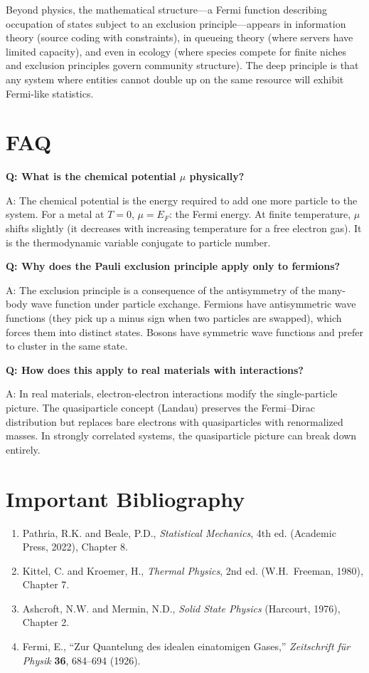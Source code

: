 Beyond physics, the mathematical structure---a Fermi function describing occupation of states subject to an exclusion principle---appears in information theory (source coding with constraints), in queueing theory (where servers have limited capacity), and even in ecology (where species compete for finite niches and exclusion principles govern community structure). The deep principle is that any system where entities cannot double up on the same resource will exhibit Fermi-like statistics.

\section*{FAQ}

\textbf{Q: What is the chemical potential $\mu$ physically?}

A: The chemical potential is the energy required to add one more particle to the system. For a metal at $T = 0$, $\mu = E_F$: the Fermi energy. At finite temperature, $\mu$ shifts slightly (it decreases with increasing temperature for a free electron gas). It is the thermodynamic variable conjugate to particle number.

\textbf{Q: Why does the Pauli exclusion principle apply only to fermions?}

A: The exclusion principle is a consequence of the antisymmetry of the many-body wave function under particle exchange. Fermions have antisymmetric wave functions (they pick up a minus sign when two particles are swapped), which forces them into distinct states. Bosons have symmetric wave functions and prefer to cluster in the same state.

\textbf{Q: How does this apply to real materials with interactions?}

A: In real materials, electron-electron interactions modify the single-particle picture. The quasiparticle concept (Landau) preserves the Fermi--Dirac distribution but replaces bare electrons with quasiparticles with renormalized masses. In strongly correlated systems, the quasiparticle picture can break down entirely.
\section*{Important Bibliography}

\begin{enumerate}
\item Pathria, R.K. and Beale, P.D., \textit{Statistical Mechanics}, 4th ed. (Academic Press, 2022), Chapter 8.
\item Kittel, C. and Kroemer, H., \textit{Thermal Physics}, 2nd ed. (W.H.\ Freeman, 1980), Chapter 7.
\item Ashcroft, N.W. and Mermin, N.D., \textit{Solid State Physics} (Harcourt, 1976), Chapter 2.
\item Fermi, E., ``Zur Quantelung des idealen einatomigen Gases,'' \textit{Zeitschrift f\"ur Physik} \textbf{36}, 684--694 (1926).
\end{enumerate}

